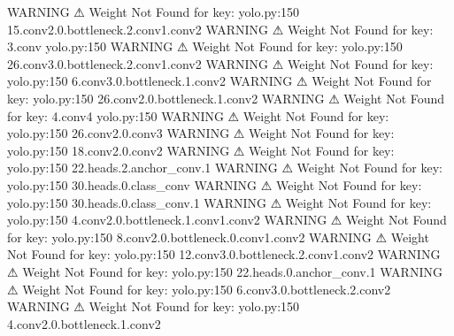                     WARNING  ⚠ Weight Not Found for key:               yolo.py:150
                             15.conv2.0.bottleneck.2.conv1.conv2                  
                    WARNING  ⚠ Weight Not Found for key: 3.conv        yolo.py:150
                    WARNING  ⚠ Weight Not Found for key:               yolo.py:150
                             26.conv3.0.bottleneck.2.conv1.conv2                  
                    WARNING  ⚠ Weight Not Found for key:               yolo.py:150
                             6.conv3.0.bottleneck.1.conv2                         
                    WARNING  ⚠ Weight Not Found for key:               yolo.py:150
                             26.conv2.0.bottleneck.1.conv2                        
                    WARNING  ⚠ Weight Not Found for key: 4.conv4       yolo.py:150
                    WARNING  ⚠ Weight Not Found for key:               yolo.py:150
                             26.conv2.0.conv3                                     
                    WARNING  ⚠ Weight Not Found for key:               yolo.py:150
                             18.conv2.0.conv2                                     
                    WARNING  ⚠ Weight Not Found for key:               yolo.py:150
                             22.heads.2.anchor_conv.1                             
                    WARNING  ⚠ Weight Not Found for key:               yolo.py:150
                             30.heads.0.class_conv                                
                    WARNING  ⚠ Weight Not Found for key:               yolo.py:150
                             30.heads.0.class_conv.1                              
                    WARNING  ⚠ Weight Not Found for key:               yolo.py:150
                             4.conv2.0.bottleneck.1.conv1.conv2                   
                    WARNING  ⚠ Weight Not Found for key:               yolo.py:150
                             8.conv2.0.bottleneck.0.conv1.conv2                   
                    WARNING  ⚠ Weight Not Found for key:               yolo.py:150
                             12.conv3.0.bottleneck.2.conv1.conv2                  
                    WARNING  ⚠ Weight Not Found for key:               yolo.py:150
                             22.heads.0.anchor_conv.1                             
                    WARNING  ⚠ Weight Not Found for key:               yolo.py:150
                             6.conv3.0.bottleneck.2.conv2                         
                    WARNING  ⚠ Weight Not Found for key:               yolo.py:150
                             4.conv2.0.bottleneck.1.conv2                         
